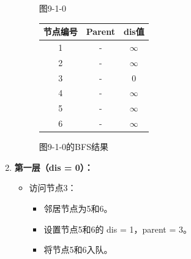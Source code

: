 \documentclass{article}
\begin{document}
\begin{enumerate}
\begin{figure}[htbp]
\begin{minipage}[b]{0.6\textwidth}
            \caption{图9-1-0}
            \label{fig:9-1-0}
        \end{minipage}%
        \hfill%
        \begin{minipage}[b]{0.4\textwidth}    %
            \centering
            \begin{tabular}{|c|c|c|}
                \hline
                节点编号 & Parent & dis值 \\
                \hline
                1 & - & $\infty$ \\
                2 & - & $\infty$ \\
                3 & - & 0 \\
                4 & - & $\infty$ \\
                5 & - & $\infty$ \\
                6 & - & $\infty$ \\
                \hline
            \end{tabular}
            \caption{图9-1-0的BFS结果}
            \label{tab:graph9-1-0-bfs}
        \end{minipage}
    \end{figure}

    \pagebreak

    \item \textbf{第一层（dis = 0）：}

    \begin{itemize}
        \item 访问节点3：
        \begin{itemize}
            \item 邻居节点为5和6。
            \item 设置节点5和6的 dis = 1，parent = 3。
            \item 将节点5和6入队。
        \end{itemize}


\end{itemize}
\end{enumerate}
\end{document}
